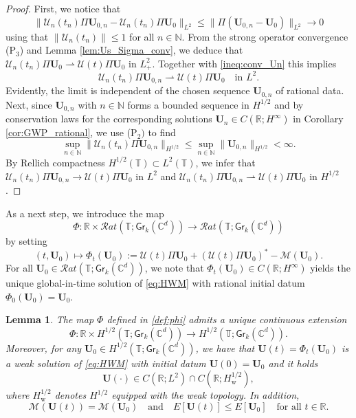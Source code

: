 \documentclass[10pt,reqno,a4paper]{amsart}
\newtheorem{lem}{Lemma}[section]
\theoremstyle{definition}
\theoremstyle{remark}
\theoremstyle{remark}
\numberwithin{equation}{section}
\newcommand{\C}{\mathbb{C}}
\newcommand{\N}{\mathbb{N}}
\newcommand{\R}{\mathbb{R}}
\newcommand{\T}{\mathbb{T}}
\newcommand{\Mean}{\mathscr{M}}
\newcommand{\be}{\begin{equation}}
\newcommand{\ee}{\end{equation}}
\newcommand{\weakto}{\rightharpoonup}
\newcommand{\Ub}{\mathbf{U}}
\newcommand{\Gr}{\mathsf{Gr}}
\newcommand{\Us}{\mathscr{U}}
\begin{document}
\begin{proof}
First, we notice that
\be \label{ineq:conv_Un}
\| \Us_n(t_n) \Pi \Ub_{0,n} - \Us_n(t_n) \Pi \Ub_0 \|_{L^2} \leq \| \Pi ( \Ub_{0,n} - \Ub_0 )\|_{L^2} \to 0
\ee
using that $\| \Us_n(t_n) \| \leq 1$ for all $n \in \N$. From the strong operator convergence (P$_3$) and Lemma \ref{lem:Us_Sigma_conv}, we deduce that $\Us_n(t_n) \Pi \Ub_0 \weakto \Us(t) \Pi \Ub_0$ in $L^2_+$.  Together with \eqref{ineq:conv_Un} this implies
$$
\Us_n(t_n) \Pi \Ub_{0,n} \weakto \Us(t) \Pi \Ub_0 \quad \mbox{in $L^2$}.
$$
Evidently, the limit is independent of the chosen sequence $\Ub_{0,n}$ of rational data. Next, since $\Ub_{0,n}$ with $n \in \N$ forms a bounded sequence in $H^{1/2}$ and by conservation laws for the corresponding solutions $\Ub_n \in C(\R; H^\infty)$ in Corollary \ref{cor:GWP_rational}, we use (P$_2)$ to find 
$$
\sup_{n \in \N} \| \Us_n(t_n) \Pi \Ub_{0,n} \|_{H^{1/2}} \leq \sup_{n \in \N} \| \Ub_{0,n} \|_{H^{1/2}} < \infty.
$$
By  Rellich compactness $H^{1/2}(\T) \subset L^2(\T)$, we infer that $\Us_n(t_n) \Pi \Ub_{0,n} \to \Us(t) \Pi \Ub_0$ in $L^2$ and $\Us_n(t_n) \Pi \Ub_{0,n} \weakto \Us(t) \Pi \Ub_0$ in $H^{1/2}$. 
\end{proof}

As a next step, we introduce the map 
\be \label{def:phi}
\Phi : \R \times \mathcal{R}at(\T; \Gr_k(\C^d)) \to  \mathcal{R}at(\T; \Gr_k(\C^d))
\ee
by setting
$$
(t, \Ub_0) \mapsto \Phi_t(\Ub_0) := \Us(t) \Pi \Ub_0 + (\Us(t) \Pi \Ub_0)^* - \Mean(\Ub_0).
$$
For all $\Ub_0 \in \mathcal{R}at(\T; \Gr_k(\C^d))$, we note that $\Phi_t(\Ub_0) \in C(\R; H^\infty)$ yields the unique global-in-time solution of \eqref{eq:HWM} with rational initial datum $\Phi_0(\Ub_0)=\Ub_0$. 

\begin{lem} \label{lem:extension}
The map $\Phi$ defined in \eqref{def:phi} admits a unique continuous extension 
$$
\Phi : \R \times H^{1/2}(\T; \Gr_k(\C^d)) \to  H^{1/2}(\T; \Gr_k(\C^d)).
$$
Moreover, for any $\Ub_0 \in H^{1/2}(\T; \Gr_k(\C^d))$, we have that $\Ub(t) = \Phi_t(\Ub_0)$ is a weak solution of \eqref{eq:HWM} with initial datum $\Ub(0) = \Ub_0$ and it holds
$$
\Ub(\cdot) \in C(\R; L^2) \cap C(\R; H^{1/2}_{\mathrm{w}}),
$$
where $H^{1/2}_{\mathrm{w}}$ denotes $H^{1/2}$ equipped with the weak topology. In addition,
$$
\Mean(\Ub(t)) = \Mean(\Ub_0) \quad \mbox{and} \quad E[\Ub(t)] \leq E[\Ub_0] \quad \mbox{for all $t \in \R$}.
$$
\end{lem}
\end{document}
